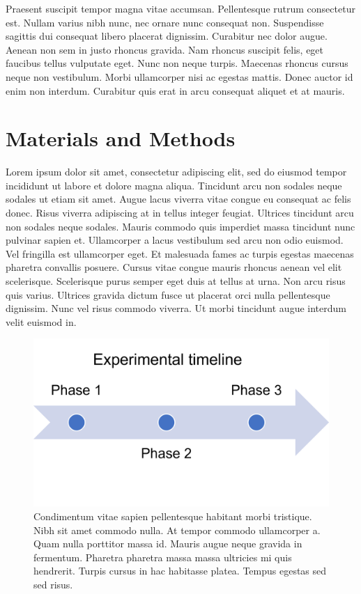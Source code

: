 \documentclass[
]{article}
\begin{document}
Praesent suscipit tempor magna vitae accumsan. Pellentesque rutrum consectetur est. Nullam varius nibh nunc, nec ornare nunc consequat non. Suspendisse sagittis dui consequat libero placerat dignissim. Curabitur nec dolor augue. Aenean non sem in justo rhoncus gravida. Nam rhoncus suscipit felis, eget faucibus tellus vulputate eget. Nunc non neque turpis. Maecenas rhoncus cursus neque non vestibulum. Morbi ullamcorper nisi ac egestas mattis. Donec auctor id enim non interdum. Curabitur quis erat in arcu consequat aliquet et at mauris.

\hypertarget{materials-and-methods}{%
\section{Materials and Methods}\label{materials-and-methods}}

Lorem ipsum dolor sit amet, consectetur adipiscing elit, sed do eiusmod tempor incididunt ut labore et dolore magna aliqua. Tincidunt arcu non sodales neque sodales ut etiam sit amet. Augue lacus viverra vitae congue eu consequat ac felis donec. Risus viverra adipiscing at in tellus integer feugiat. Ultrices tincidunt arcu non sodales neque sodales. Mauris commodo quis imperdiet massa tincidunt nunc pulvinar sapien et. Ullamcorper a lacus vestibulum sed arcu non odio euismod. Vel fringilla est ullamcorper eget. Et malesuada fames ac turpis egestas maecenas pharetra convallis posuere. Cursus vitae congue mauris rhoncus aenean vel elit scelerisque. Scelerisque purus semper eget duis at tellus at urna. Non arcu risus quis varius. Ultrices gravida dictum fusce ut placerat orci nulla pellentesque dignissim. Nunc vel risus commodo viverra. Ut morbi tincidunt augue interdum velit euismod in.

\begin{figure}

{\centering \includegraphics[width=21.69in]{../figures/experimental_timeline} 

}

\caption{Condimentum vitae sapien pellentesque habitant morbi tristique. Nibh sit amet commodo nulla. At tempor commodo ullamcorper a. Quam nulla porttitor massa id. Mauris augue neque gravida in fermentum. Pharetra pharetra massa massa ultricies mi quis hendrerit. Turpis cursus in hac habitasse platea. Tempus egestas sed sed risus.}\label{fig:experimental-design}
\end{figure}
\end{document}
